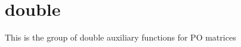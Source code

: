 \hypertarget{group__doublePOauxiliary}{}\section{double}
\label{group__doublePOauxiliary}
This is the group of double auxiliary functions for P\+O matrices 